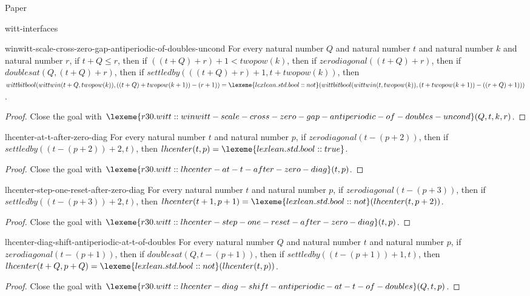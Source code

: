 \begin{lexlean}{Paper}
\begin{section}{witt-interfaces}
  \begin{theorem}{winwitt-scale-cross-zero-gap-antiperiodic-of-doubles-uncond}
  For every natural number \(Q\) and natural number \(t\) and natural number \(k\) and natural number \(r\), if \(t + Q ≤ r\), then if \(((t + Q) + r) + 1 < twopow(k)\), then if \(zerodiagonal((t + Q) + r)\), then if \(doublesat(Q, (t + Q) + r)\), then if \(settledby(((t + Q) + r) + 1, t + twopow(k))\), then \(wittbitbool(wittwin(t + Q, twopow(k)), ((t + Q) + twopow(k + 1)) - (r + 1)) = \lexeme{lexlean.std.bool::not}(wittbitbool(wittwin(t, twopow(k)), (t + twopow(k + 1)) - ((r + Q) + 1)))\).
  \begin{proof}
  Close the goal with \(\lexeme{r30.witt::winwitt-scale-cross-zero-gap-antiperiodic-of-doubles-uncond}(Q, t, k, r)\).
  \end{proof}
  \end{theorem}

  \begin{theorem}{lhcenter-at-t-after-zero-diag}
  For every natural number \(t\) and natural number \(p\), if \(zerodiagonal(t - (p + 2))\), then if \(settledby((t - (p + 2)) + 2, t)\), then \(lhcenter(t, p) = \lexeme{lexlean.std.bool::true}\).
  \begin{proof}
  Close the goal with \(\lexeme{r30.witt::lhcenter-at-t-after-zero-diag}(t, p)\).
  \end{proof}
  \end{theorem}

  \begin{theorem}{lhcenter-step-one-reset-after-zero-diag}
  For every natural number \(t\) and natural number \(p\), if \(zerodiagonal(t - (p + 3))\), then if \(settledby((t - (p + 3)) + 2, t)\), then \(lhcenter(t + 1, p + 1) = \lexeme{lexlean.std.bool::not}(lhcenter(t, p + 2))\).
  \begin{proof}
  Close the goal with \(\lexeme{r30.witt::lhcenter-step-one-reset-after-zero-diag}(t, p)\).
  \end{proof}
  \end{theorem}

  \begin{theorem}{lhcenter-diag-shift-antiperiodic-at-t-of-doubles}
  For every natural number \(Q\) and natural number \(t\) and natural number \(p\), if \(zerodiagonal(t - (p + 1))\), then if \(doublesat(Q, t - (p + 1))\), then if \(settledby((t - (p + 1)) + 1, t)\), then \(lhcenter(t + Q, p + Q) = \lexeme{lexlean.std.bool::not}(lhcenter(t, p))\).
  \begin{proof}
  Close the goal with \(\lexeme{r30.witt::lhcenter-diag-shift-antiperiodic-at-t-of-doubles}(Q, t, p)\).
  \end{proof}
  \end{theorem}


\end{section}
\end{lexlean}
